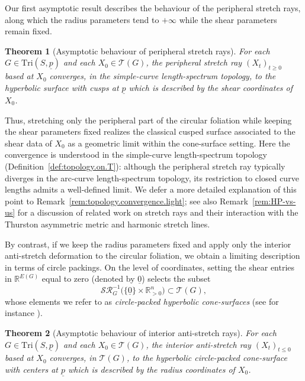\documentclass[11pt, letterpaper]{amsart}
\newtheorem{theorem}{\rm\bf Theorem}[section]
\theoremstyle{definition}
\theoremstyle{remark}
\newcommand{\up}{\underline{p}}
\newcommand{\Sp}{(S,\up)}
\newcommand{\TSp}{\text{Tri}\Sp}
\newcommand{\cSR}{\mathcal{SR}}
\newcommand{\cT}{\mathcal{T}}
\newcommand{\bR}{\mathbb{R}}
\numberwithin{equation}{section}
\begin{document}
Our first asymptotic result describes the behaviour of the peripheral stretch rays, along which the radius parameters tend to \(+\infty\) while the shear parameters remain fixed.

\begin{theorem}[Asymptotic behaviour of peripheral stretch rays]\label{thm:asym.behavior}
For each \(G \in \TSp\) and each \(X_0 \in \cT(G)\), the peripheral stretch ray \((X_t)_{t \ge 0}\) based at \(X_0\) converges, in the simple-curve length-spectrum topology, to the hyperbolic surface with cusps at \(\underline{p}\) which is described by the shear coordinates of \(X_0\).
\end{theorem}

Thus, stretching only the peripheral part of the circular foliation while keeping the shear parameters fixed
realizes the classical cusped surface associated to the shear data of \(X_0\) as a geometric limit within the cone-surface setting.
Here the convergence is understood in the simple-curve length-spectrum topology (Definition~\ref{def:topology.on.T}):
although the peripheral stretch ray typically diverges in the arc-curve length-spectrum topology, its restriction to closed curve lengths admits a well-defined limit.
We defer a more detailed explanation of this point to Remark~\ref{rem:topology.convergence.light};
see also Remark~\ref{rem:HP-vs-us} for a discussion of related work on stretch rays and their interaction with the Thurston asymmetric metric and harmonic stretch lines.

By contrast, if we keep the radius parameters fixed and apply only the interior anti-stretch deformation to the circular foliation, we obtain a limiting description in terms of circle packings.
On the level of coordinates, setting the shear entries in \(\bR^{E(G)}\) equal to zero (denoted by \(\underline{0}\)) selects the subset
\[
  \cSR_G^{-1}\bigl(\{\underline{0}\} \times \bR^n_{>0}\bigr) \subset \cT(G),
\]
whose elements we refer to as \emph{circle-packed hyperbolic cone-surfaces} (see for instance \cite{BHS23}).

\begin{theorem}[Asymptotic behaviour of interior anti-stretch rays]\label{thm:asym.behavior1}
For each \(G \in \TSp\) and each \(X_0 \in \cT(G)\), the interior anti-stretch ray \((X_t)_{t \le 0}\) based at \(X_0\) converges, in \(\cT(G)\), to the hyperbolic circle-packed cone-surface with centers at \(\underline{p}\) which is described by the radius coordinates of \(X_0\).
\end{theorem}
\end{document}
